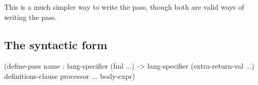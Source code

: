 \documentclass[letterpaper,10pt]{article}
\begin{document}
This is a much simpler way to write the pass, though both are valid ways of
writing the pass.

\begin{schemeregion}
\subsection{The  syntactic form}
\end{schemeregion}


\begin{schemedisplay}
(define-pass name : lang-specifier (fml ...) -> lang-specifier (extra-return-val ...)
  definitions-clause
  processor ...
  body-expr)
\end{schemedisplay}
\end{document}
